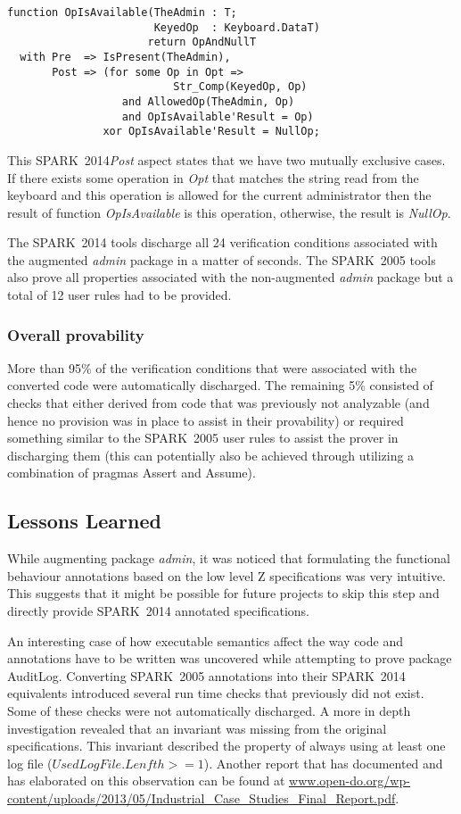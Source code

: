 \documentclass[10pt,a4paper,twocolumn]{article}
\newcommand{\oldspark}{SPARK~2005\xspace}
\newcommand{\newspark}{SPARK~2014\xspace}
\begin{document}
\begin{lstlisting}[caption=\newspark]
function OpIsAvailable(TheAdmin : T;
                       KeyedOp  : Keyboard.DataT)
                      return OpAndNullT
  with Pre  => IsPresent(TheAdmin),
       Post => (for some Op in Opt =>
                          Str_Comp(KeyedOp, Op)
                  and AllowedOp(TheAdmin, Op)
                  and OpIsAvailable'Result = Op)
               xor OpIsAvailable'Result = NullOp;
\end{lstlisting}
This \newspark \emph{Post} aspect states that we have two mutually
exclusive cases. If there exists some operation in \emph{Opt} that
matches the string read from the keyboard and this operation is
allowed for the current administrator then the result of function
\emph{OpIsAvailable} is this operation, otherwise, the result is
\emph{NullOp}.

The \newspark tools discharge all 24 verification conditions
associated with the augmented \emph{admin} package in a matter of
seconds. The \oldspark tools also prove all properties associated with
the non-augmented \emph{admin} package but a total of 12 user rules had
to be provided.

\subsubsection{Overall provability}

More than 95\% of the verification conditions that were associated
with the converted code were automatically discharged. The remaining
5\% consisted of checks that either derived from code that was
previously not analyzable (and hence no provision was in place to
assist in their provability) or required something similar to the
\oldspark user rules to assist the prover in discharging them (this
can potentially also be achieved through utilizing a combination of
pragmas Assert and Assume).

\subsection{Lessons Learned}

While augmenting package \emph{admin}, it was noticed that formulating
the functional behaviour annotations based on the low level Z
specifications was very intuitive. This suggests that it might be
possible for future projects to skip this step and directly provide
\newspark annotated specifications.

An interesting case of how executable semantics affect the way code
and annotations have to be written was uncovered while attempting to
prove package AuditLog. Converting \oldspark annotations into their
\newspark equivalents introduced several run time checks that
previously did not exist. Some of these checks were not automatically
discharged. A more in depth investigation revealed that an invariant
was missing from the original specifications. This invariant described
the property of always using at least one log file
($UsedLogFile.Lenfth >= 1$). Another report that has documented and
has elaborated on this observation can be found at
\url{www.open-do.org/wp-content/uploads/2013/05/Industrial_Case_Studies_Final_Report.pdf}.
\end{document}
